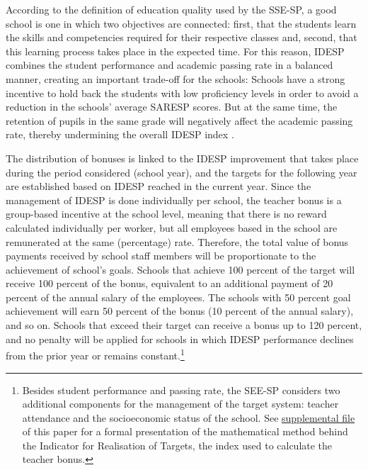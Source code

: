 \documentclass[a4paper, 12pt]{article}
\begin{document}
According to the definition of education quality used by the SSE-SP, a good school is one in which two objectives are connected: first, that the students learn the skills and competencies required for their respective classes and, second, that this learning process takes place in the expected time. For this reason, IDESP combines the student performance and academic passing rate in a balanced manner, creating an important trade-off for the schools: Schools have a strong incentive to hold back the students with low proficiency levels in order to avoid a reduction in the schools’ average SARESP scores. But at the same time, the retention of pupils in the same grade will negatively affect the academic passing rate, thereby undermining the overall IDESP index \citep{SEESP2018}.


The distribution of bonuses is linked to the IDESP improvement that takes place during the period considered (school year), and the targets for the following year are established based on IDESP reached in the current year. Since the management of IDESP is done individually per school, the teacher bonus is a group-based incentive at the school level, meaning that there is no reward calculated individually per worker, but all employees based in the school are remunerated at the same (percentage) rate. Therefore, the total value of bonus payments received by school staff members will be proportionate to the achievement of school's goals. Schools that achieve 100 percent of the target will receive 100 percent of the bonus, equivalent to an additional payment of 20 percent of the annual salary of the employees. The schools with 50 percent goal achievement will earn 50 percent of the bonus (10 percent of the annual salary), and so on. Schools that exceed their target can receive a bonus up to 120 percent, and no penalty will be applied for schools in which IDESP performance declines from the prior year or remains constant.\footnote{Besides student performance and passing rate, the SEE-SP considers two additional components for the management of the target system: teacher attendance and the socioeconomic status of the school. See \hyperref[SuppMaterial]{supplemental file} of this paper for a formal presentation of the mathematical method behind the Indicator for Realisation of Targets, the index used to calculate the teacher bonus.}
\end{document}
